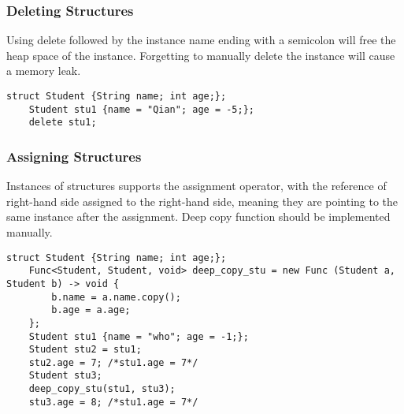 \subsubsection{Deleting Structures}
Using delete followed by the instance name ending with a semicolon will free the heap space of the instance. Forgetting to manually delete the instance will cause a memory leak.
\begin{lstlisting}[caption={struct\_delete.csm}, captionpos=b]
    struct Student {String name; int age;};
    Student stu1 {name = "Qian"; age = -5;};
    delete stu1;
\end{lstlisting}
\subsubsection{Assigning Structures}
Instances of structures supports the assignment operator, with the reference of right-hand side assigned to the right-hand side, meaning they are pointing to the same instance after the assignment. Deep copy function should be implemented manually.
\begin{lstlisting}[caption={struct\_deep\_cpoy.csm}, captionpos=b]
    struct Student {String name; int age;};
    Func<Student, Student, void> deep_copy_stu = new Func (Student a, Student b) -> void {
        b.name = a.name.copy();
        b.age = a.age;
    };
    Student stu1 {name = "who"; age = -1;};
    Student stu2 = stu1;
    stu2.age = 7; /*stu1.age = 7*/
    Student stu3;
    deep_copy_stu(stu1, stu3);
    stu3.age = 8; /*stu1.age = 7*/
\end{lstlisting}


